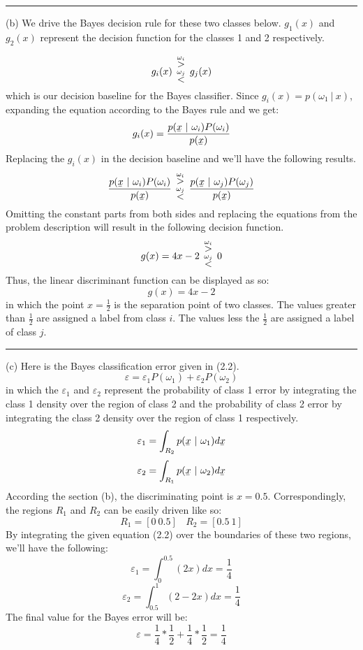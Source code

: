 \documentclass[12pt]{article}
\numberwithin{equation}{section}
\numberwithin{table}{section}
\numberwithin{figure}{section}
\newcommand{\eps}{\varepsilon}
\newcommand*{\bfrac}[2]{\genfrac{}{}{0pt}{}{#1}{#2}}
\begin{document}
\noindent\rule{\textwidth}{.5pt}
(b) We drive the Bayes decision rule for these two classes below. $g_1(x)$ and $g_2(x)$ represent the decision function for the classes 1 and 2 respectively.

$$
	g_i(x)\ \bfrac{\overset{\omega_i}{>}}{\overset{\omega_j}{<}}\ g_j(x)
$$
which is our decision baseline for the Bayes classifier. Since $g_i(x) = p(\omega_1\ |\ x)$, expanding the equation according to the Bayes rule and we get:
$$
	g_i(x) = \frac{p(\underaccent{\bar}{x}\ |\ \omega_i)P(\omega_i)}{p(\underaccent{\bar}{x})}
$$
Replacing the $g_i(x)$ in the decision baseline and we'll have the following results.
$$
	\frac{p(\underaccent{\bar}{x}\ |\ \omega_i)P(\omega_i)}{p(\underaccent{\bar}{x})}\  \bfrac{\overset{\omega_i}{>}}{\overset{\omega_j}{<}}\ \frac{p(\underaccent{\bar}{x}\ |\ \omega_j)P(\omega_j)}{p(\underaccent{\bar}{x})}
$$
Omitting the constant parts from both sides and replacing the equations from the problem description will result in the following decision function.
\begin{equation}
	g(x) = 4x - 2\ \bfrac{\overset{\omega_i}{>}}{\overset{\omega_j}{<}}\ 0
\end{equation}
Thus, the linear discriminant function can be displayed as so:
$$
	g(x) = 4x - 2
$$
in which the point $x = \frac{1}{2}$ is the separation point of two classes. The values greater than $\frac{1}{2}$ are assigned a label from class $i$. The values less the $\frac{1}{2}$ are assigned a label of class $j$.

\noindent\rule{\textwidth}{.5pt}
(c) Here is the Bayes classification error given in (2.2).
\begin{equation}
	\eps = \eps_1P(\omega_1) + \eps_2P(\omega_2)
\end{equation}
in which the $\eps_1$ and $\eps_2$ represent the probability of class 1 error by integrating the class 1 density over the region of class 2 and the probability of class 2 error by integrating the class 2 density over the region of class 1 respectively.
$$
	\eps_1 = \int_{R_2} p(\underaccent{\bar}{x}\ |\ \omega_1)d\underaccent{\bar}{x}
$$
$$
	\eps_2 = \int_{R_1} p(\underaccent{\bar}{x}\ |\ \omega_2)d\underaccent{\bar}{x}
$$
According the section (b), the discriminating point is $x = 0.5$. Correspondingly, the regions $R_1$ and $R_2$ can be easily driven like so:
$$
	R_1 = [0\ 0.5] \ \ \ \ R_2 = [0.5\ 1]
$$
By integrating the given equation (2.2) over the boundaries of these two regions, we'll have the following:
$$
	\eps_1 = \int_{0}^{0.5}(2x) dx = \frac{1}{4}
$$
$$
	\eps_2 = \int_{0.5}^{1} (2-2x)dx = \frac{1}{4}
$$
The final value for the Bayes error will be:
$$
	\eps = \frac{1}{4} * \frac{1}{2} + \frac{1}{4} * \frac{1}{2} = \frac{1}{4}
$$
\end{document}
